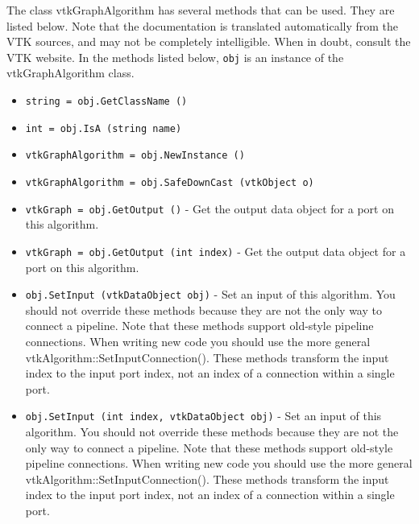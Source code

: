 The class vtkGraphAlgorithm has several methods that can be used.
  They are listed below.
Note that the documentation is translated automatically from the VTK sources,
and may not be completely intelligible.  When in doubt, consult the VTK website.
In the methods listed below, \verb|obj| is an instance of the vtkGraphAlgorithm class.
\begin{itemize}
\item  \verb|string = obj.GetClassName ()|

\item  \verb|int = obj.IsA (string name)|

\item  \verb|vtkGraphAlgorithm = obj.NewInstance ()|

\item  \verb|vtkGraphAlgorithm = obj.SafeDownCast (vtkObject o)|

\item  \verb|vtkGraph = obj.GetOutput ()| -  Get the output data object for a port on this algorithm.

\item  \verb|vtkGraph = obj.GetOutput (int index)| -  Get the output data object for a port on this algorithm.

\item  \verb|obj.SetInput (vtkDataObject obj)| -  Set an input of this algorithm. You should not override these
 methods because they are not the only way to connect a pipeline.
 Note that these methods support old-style pipeline connections.
 When writing new code you should use the more general
 vtkAlgorithm::SetInputConnection().  These methods transform the
 input index to the input port index, not an index of a connection
 within a single port.

\item  \verb|obj.SetInput (int index, vtkDataObject obj)| -  Set an input of this algorithm. You should not override these
 methods because they are not the only way to connect a pipeline.
 Note that these methods support old-style pipeline connections.
 When writing new code you should use the more general
 vtkAlgorithm::SetInputConnection().  These methods transform the
 input index to the input port index, not an index of a connection
 within a single port.

\end{itemize}
